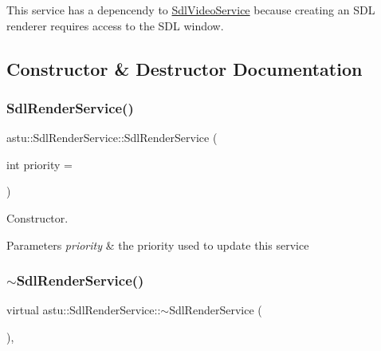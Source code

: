 This service has a depencendy to \hyperlink{classastu_1_1SdlVideoService}{Sdl\+Video\+Service} because creating an S\+DL renderer requires access to the S\+DL window. 

\subsection{Constructor \& Destructor Documentation}
\mbox{\label{classastu_1_1SdlRenderService_a8669793d9701f979c90cd802575a2645}} 
\subsubsection{\texorpdfstring{Sdl\+Render\+Service()}{SdlRenderService()}}
{\footnotesize\ttfamily astu\+::\+Sdl\+Render\+Service\+::\+Sdl\+Render\+Service (\begin{DoxyParamCaption}\item[{int}]{priority = {} }\end{DoxyParamCaption})}

Constructor.


\begin{DoxyParams}{Parameters}
{\em priority} & the priority used to update this service \\
\hline
\end{DoxyParams}
\mbox{\label{classastu_1_1SdlRenderService_a0ec8c27982cfa6ace6b28e50fba78f2a}} 
\subsubsection{\texorpdfstring{$\sim$\+Sdl\+Render\+Service()}{~SdlRenderService()}}
{\footnotesize\ttfamily virtual astu\+::\+Sdl\+Render\+Service\+::$\sim$\+Sdl\+Render\+Service (\begin{DoxyParamCaption}{ }\end{DoxyParamCaption})\hspace{0.3cm}{\ttfamily [inline]}, {\ttfamily [virtual]}}

